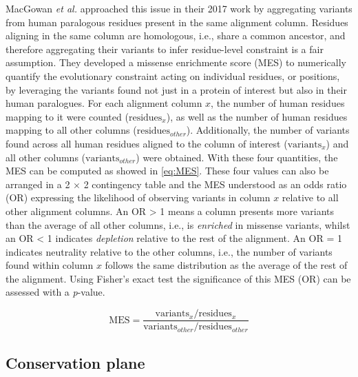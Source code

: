 MacGowan \textit{et al.} approached this issue in their 2017 work \cite{MACGOWAN_2017_VARIANTS} by aggregating variants from human paralogous residues present in the same alignment column. Residues aligning in the same column are homologous, i.e., share a common ancestor, and therefore aggregating their variants to infer residue-level constraint is a fair assumption. They developed a missense enrichmente score (MES) to numerically quantify the evolutionary constraint acting on individual residues, or positions, by leveraging the variants found not just in a protein of interest but also in their human paralogues. For each alignment column $x$, the number of human residues mapping to it were counted ($\text{residues}_x$), as well as the number of human residues mapping to all other columns ($\text{residues}_{other}$). Additionally, the number of variants found across all human residues aligned to the column of interest ($\text{variants}_x$) and all other columns ($\text{variants}_{other}$) were obtained. With these four quantities, the MES can be computed as showed in \autoref{eq:MES}. These four values can also be arranged in a 2 $\times$ 2 contingency table and the MES understood as an odds ratio (OR) expressing the likelihood of observing variants in column $x$ relative to all other alignment columns. An OR > 1 means a column presents more variants than the average of all other columns, i.e., is \textit{enriched} in missense variants, whilst an OR < 1 indicates \textit{depletion} relative to the rest of the alignment. An OR = 1 indicates neutrality relative to the other columns, i.e., the number of variants found within column $x$ follows the same distribution as the average of the rest of the alignment. Using Fisher's exact test \cite{FISHER_1935_TEST} the significance of this MES (OR) can be assessed with a \textit{p}-value.

\begin{equation}
\text{MES} = \frac{\text{variants}_x / \text{residues}_x}{\text{variants}_{other} /\text{residues}_{other}}
\label{eq:MES}
\end{equation}

\vspace{-13pt} %
\vspace{-13pt} %

\subsection{Conservation plane}

